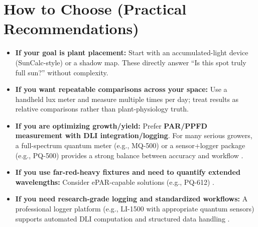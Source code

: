 \documentclass[11pt]{article}
\begin{document}
\section{How to Choose (Practical Recommendations)}
\begin{itemize}
  \item \textbf{If your goal is plant placement:} Start with an accumulated-light device (SunCalc-style) or a shadow map. These directly answer ``Is this spot truly full sun?'' without complexity.
  \item \textbf{If you want repeatable comparisons across your space:} Use a handheld lux meter and measure multiple times per day; treat results as relative comparisons rather than plant-physiology truth.
  \item \textbf{If you are optimizing growth/yield:} Prefer \textbf{PAR/PPFD measurement with DLI integration/logging}. For many serious growers, a full-spectrum quantum meter (e.g., MQ-500) or a sensor+logger package (e.g., PQ-500) provides a strong balance between accuracy and workflow \cite{apogee_mq500_page,apogee_pq500,apogee_dli_measuring}.
  \item \textbf{If you use far-red-heavy fixtures and need to quantify extended wavelengths:} Consider ePAR-capable solutions (e.g., PQ-612) \cite{apogee_pq612}.
  \item \textbf{If you need research-grade logging and standardized workflows:} A professional logger platform (e.g., LI-1500 with appropriate quantum sensors) supports automated DLI computation and structured data handling \cite{licor_calculating_dli,licor_li1500_product}.
\end{itemize}
\end{document}
